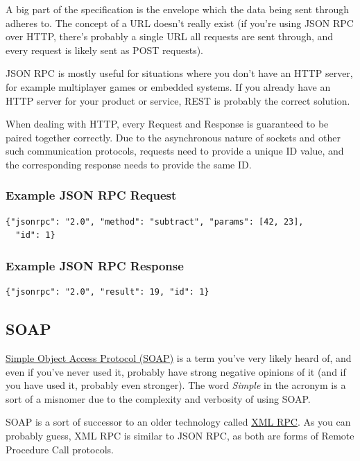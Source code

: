 \documentclass{book}
\begin{document}
A big part of the specification is the envelope which the data being sent through adheres to. The concept of a URL doesn't really exist (if you're using JSON RPC over HTTP, there's probably a single URL all requests are sent through, and every request is likely sent as POST requests).

JSON RPC is mostly useful for situations where you don't have an HTTP server, for example multiplayer games or embedded systems. If you already have an HTTP server for your product or service, REST is probably the correct solution.

When dealing with HTTP, every Request and Response is guaranteed to be paired together correctly. Due to the asynchronous nature of sockets and other such communication protocols, requests need to provide a unique ID value, and the corresponding response needs to provide the same ID.

\subsubsection{Example JSON RPC Request}

\begin{verbatim}
{"jsonrpc": "2.0", "method": "subtract", "params": [42, 23],
  "id": 1}
\end{verbatim}

\subsubsection{Example JSON RPC Response}

\begin{verbatim}
{"jsonrpc": "2.0", "result": 19, "id": 1}
\end{verbatim}


\subsection{SOAP}

\href{https://en.wikipedia.org/wiki/SOAP}{Simple Object Access Protocol (SOAP)} is a term you've very likely heard of, and even if you've never used it, probably have strong negative opinions of it (and if you have used it, probably even stronger). The word \emph{Simple} in the acronym is a sort of a misnomer due to the complexity and verbosity of using SOAP.

SOAP is a sort of successor to an older technology called \href{https://en.wikipedia.org/wiki/XML-RPC}{XML RPC}. As you can probably guess, XML RPC is similar to JSON RPC, as both are forms of Remote Procedure Call protocols.
\end{document}

